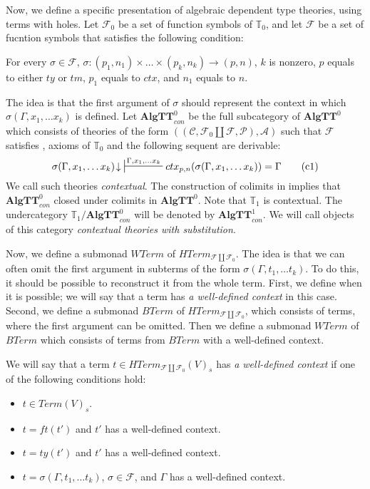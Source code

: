 \documentclass[reqno]{amsart}
\newcommand{\axtag}[1]{\label{ax:#1} \tag{#1}}
\theoremstyle{definition}
\theoremstyle{remark}
\newcommand{\cat}[1]{\mathbf{#1}}
\newcommand{\algtt}{\cat{AlgTT}}
\numberwithin{figure}{section}
\begin{document}
Now, we define a specific presentation of algebraic dependent type theories, using terms with holes.
Let $\mathcal{F}_0$ be a set of function symbols of $\mathbb{T}_0$, and let $\mathcal{F}$ be a set of fucntion symbols that satisfies the following condition:
\begin{cond}[ctx]
For every $\sigma \in \mathcal{F}$, $\sigma : (p_1,n_1) \times \ldots \times (p_k,n_k) \to (p,n)$,
    $k$ is nonzero, $p$ equals to either $ty$ or $tm$, $p_1$ equals to $ctx$, and $n_1$ equals to $n$.
\end{cond}
The idea is that the first argument of $\sigma$ should represent the context in which $\sigma(\Gamma, x_1, \ldots x_k)$ is defined.
Let $\algtt^0_{con}$ be the full subcategory of $\algtt^0$ which consists of theories of the form $((\mathcal{C}, \mathcal{F}_0 \amalg \mathcal{F}, \mathcal{P}), \mathcal{A})$
    such that $\mathcal{F}$ satisfies , axioms of $\mathbb{T}_0$ and the following sequent are derivable:
\begin{equation}
\sigma(\Gamma, x_1, \ldots x_k)\!\downarrow\ \sststile{}{\Gamma, x_1, \ldots x_k} ctx_{p,n}(\sigma(\Gamma, x_1, \ldots x_k)) = \Gamma \axtag{c1}
\end{equation}
We call such theories \emph{contextual}.
The construction of colimits in  implies that $\algtt^0_{con}$ closed under colimits in $\algtt^0$.
Note that $\mathbb{T}_1$ is contextual.
The undercategory $\mathbb{T}_1/\algtt^0_{con}$ will be denoted by $\algtt^1_{con}$.
We will call objects of this category \emph{contextual theories with substitution}.

Now, we define a submonad $WTerm$ of $HTerm_{\mathcal{F} \amalg \mathcal{F}_0}$.
The idea is that we can often omit the first argument in subterms of the form $\sigma(\Gamma, t_1, \ldots t_k)$.
To do this, it should be possible to reconstruct it from the whole term.
First, we define when it is possible; we will say that a term has \emph{a well-defined context} in this case.
Second, we define a submonad $BTerm$ of $HTerm_{\mathcal{F} \amalg \mathcal{F}_0}$, which consists of terms, where the first argument can be omitted.
Then we define a submonad $WTerm$ of $BTerm$ which consists of terms from $BTerm$ with a well-defined context.

We will say that a term $t \in HTerm_{\mathcal{F} \amalg \mathcal{F}_0}(V)_s$ has \emph{a well-defined context} if one of the following conditions hold:
\begin{itemize}
\item $t \in Term(V)_s$.
\item $t = ft(t')$ and $t'$ has a well-defined context.
\item $t = ty(t')$ and $t'$ has a well-defined context.
\item $t = \sigma(\Gamma, t_1, \ldots t_k)$, $\sigma \in \mathcal{F}$, and $\Gamma$ has a well-defined context.
\end{itemize}
\end{document}
